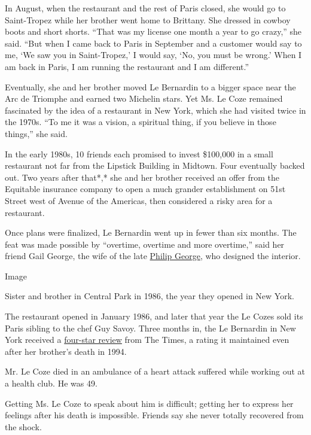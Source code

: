 In August, when the restaurant and the rest of Paris closed, she would
go to Saint-Tropez while her brother went home to Brittany. She dressed
in cowboy boots and short shorts. ``That was my license one month a year
to go crazy,'' she said. ``But when I came back to Paris in September
and a customer would say to me, `We saw you in Saint-Tropez,' I would
say, `No, you must be wrong.' When I am back in Paris, I am running the
restaurant and I am different.''

Eventually, she and her brother moved Le Bernardin to a bigger space
near the Arc de Triomphe and earned two Michelin stars. Yet Ms. Le Coze
remained fascinated by the idea of a restaurant in New York, which she
had visited twice in the 1970s. ``To me it was a vision, a spiritual
thing, if you believe in those things,'' she said.

In the early 1980s, 10 friends each promised to invest \$100,000 in a
small restaurant not far from the Lipstick Building in Midtown. Four
eventually backed out. Two years after that*,* she and her brother
received an offer from the Equitable insurance company to open a much
grander establishment on 51st Street west of Avenue of the Americas,
then considered a risky area for a restaurant.

Once plans were finalized, Le Bernardin went up in fewer than six
months. The feat was made possible by ``overtime, overtime and more
overtime,'' said her friend Gail George, the wife of the late
\href{http://www.legacy.com/obituaries/nytimes/obituary.aspx?n=philip-george\&pid=189162854}{Philip
George}, who designed the interior.

Image

Sister and brother in Central Park in 1986, the year they opened in New
York.

The restaurant opened in January 1986, and later that year the Le Cozes
sold its Paris sibling to the chef Guy Savoy. Three months in, the Le
Bernardin in New York received a
\href{https://www.nytimes3xbfgragh.onion/1986/03/28/arts/restaurants-023486.html}{four-star
review} from The Times, a rating it maintained even after her brother's
death in 1994.

Mr. Le Coze died in an ambulance of a heart attack suffered while
working out at a health club. He was 49.

Getting Ms. Le Coze to speak about him is difficult; getting her to
express her feelings after his death is impossible. Friends say she
never totally recovered from the shock.

